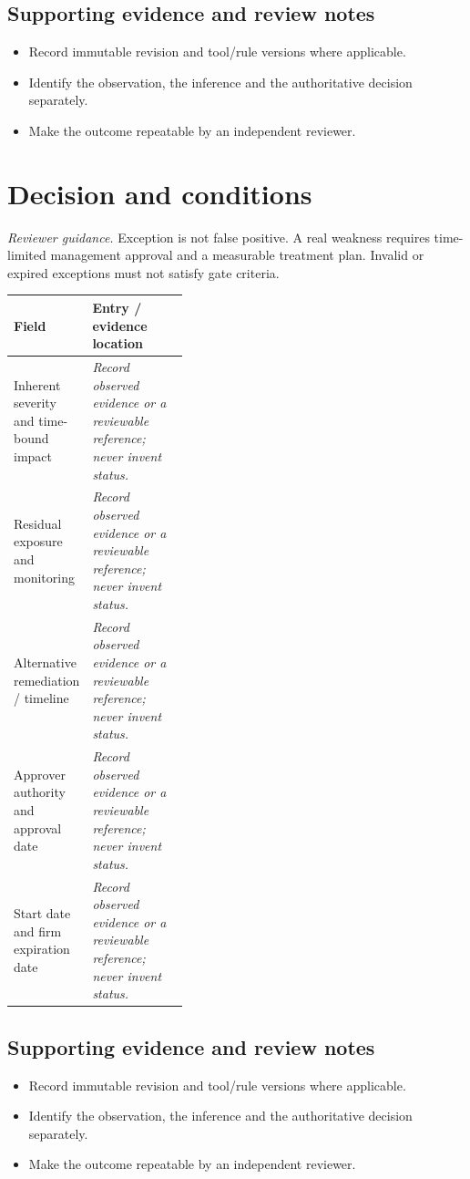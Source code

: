 \documentclass[10pt,letterpaper]{article}
\begin{document}
\subsection{Supporting evidence and review notes}
\begin{itemize}
\item Record immutable revision and tool/rule versions where applicable.
\item Identify the observation, the inference and the authoritative decision separately.
\item Make the outcome repeatable by an independent reviewer.
\end{itemize}
\clearpage
\section{Decision and conditions}
\textit{Reviewer guidance.} Exception is not false positive. A real weakness requires time-limited management approval and a measurable treatment plan. Invalid or expired exceptions must not satisfy gate criteria.
\begin{tabularx}{\linewidth}{@{}p{0.38\linewidth}Y@{}}
\toprule Field & Entry / evidence location\\\midrule
Inherent severity and time-bound impact & \textit{Record observed evidence or a reviewable reference; never invent status.}\\[1.0em]
\midrule
Residual exposure and monitoring & \textit{Record observed evidence or a reviewable reference; never invent status.}\\[1.0em]
\midrule
Alternative remediation / timeline & \textit{Record observed evidence or a reviewable reference; never invent status.}\\[1.0em]
\midrule
Approver authority and approval date & \textit{Record observed evidence or a reviewable reference; never invent status.}\\[1.0em]
\midrule
Start date and firm expiration date & \textit{Record observed evidence or a reviewable reference; never invent status.}\\[1.0em]
\midrule
\end{tabularx}
\subsection{Supporting evidence and review notes}
\begin{itemize}
\item Record immutable revision and tool/rule versions where applicable.
\item Identify the observation, the inference and the authoritative decision separately.
\item Make the outcome repeatable by an independent reviewer.
\end{itemize}
\clearpage
\end{document}
